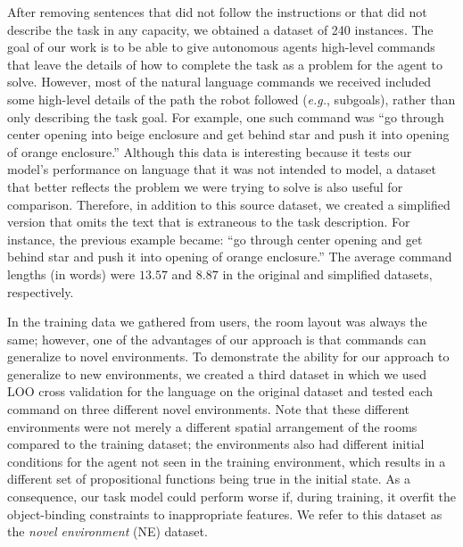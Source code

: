 \documentclass[conference]{IEEEtran}
\begin{document}
After removing sentences that did not follow the instructions or that did not describe the task in any capacity, we obtained a dataset of 240 instances. The goal of our work is to be able to give autonomous agents high-level commands that leave the details of how to complete the task as a problem for the agent to solve. However, most of the natural language commands we received included some high-level details of the path the robot followed (\emph{e.g.}, subgoals), rather than only describing the task goal. 
For example, one such command was ``go through center opening into beige enclosure and get behind star and push it into opening of orange enclosure.'' 
Although this data is interesting because it tests our model's performance on language that it was not intended to model, a dataset that better reflects the problem we were trying to solve is also useful for comparison. Therefore, in addition to this source dataset, we  created a simplified version that omits the text that is extraneous to the task description. 
For instance, the previous example became: ``go through center opening and get behind star and push it into opening of orange enclosure.'' 
The average command lengths (in words) were $13.57$ and $8.87$ in the original and simplified datasets, respectively.

In the training data we gathered from users, the room layout was always the same; however, one of the advantages of our approach is that commands can generalize to novel environments. To demonstrate the ability for our approach to generalize to new environments, we created a third dataset in which we used LOO cross validation for the language on the original dataset and tested each command on three different novel environments. Note that these different environments were not merely a different spatial arrangement of the rooms compared to the training dataset; the environments also had different initial conditions for the agent not seen in the training environment, which results in a different set of propositional functions being true in the initial state. As a consequence, our task model could perform worse if, during training, it overfit the object-binding constraints to inappropriate features. We refer to this dataset as the {\em novel environment} (NE) dataset.


\end{document}
